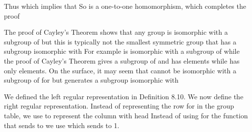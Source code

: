 \documentclass[11pt,oneside]{article}
\begin{document}
\begin{BookBody}
\noindent Thus  which implies that  So \BookInline{\phi } is a one-to-one homomorphism, which completes the proof\BookEnd{\blacklozenge}

 The proof of Cayley’s Theorem shows that any group  is isomorphic with a subgroup of  but this is typically not the smallest symmetric group that has a subgroup isomorphic with  For example is isomorphic with a subgroup of  while the proof of Cayley’s Theorem gives a subgroup of  and  has  elements while  has only  elements. On the surface, it may seem that  cannot be isomorphic with a subgroup of  for  but  generates a subgroup isomorphic with \BookEnd{\blacktriangle}

We defined the left regular representation in Definition 8.10. We now define the right regular representation. Instead of  representing the row for  in the group table, we use  to represent the column with head  Instead of using \BookInline{\phi } for the function that sends  to  we use \BookInline{\tau,\allowbreak } which sends  to  1.

\end{BookBody}

\BookNarrativetrue
\end{document}
